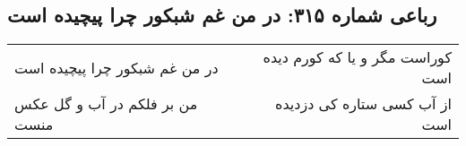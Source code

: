 \begin{center}
\section*{رباعی شماره ۳۱۵: در من غم شبکور چرا پیچیده است}
\label{sec:0315}
\begin{longtable}{l p{0.5cm} r}
در من غم شبکور چرا پیچیده است
&&
کوراست مگر و یا که کورم دیده است
\\
من بر فلکم در آب و گل عکس منست
&&
از آب کسی ستاره کی دزدیده است
\\
\end{longtable}
\end{center}
